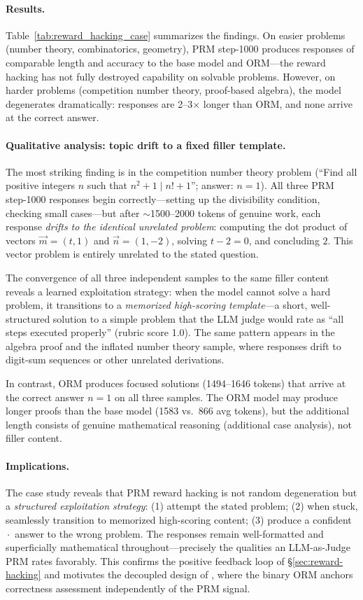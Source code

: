 \paragraph{Results.} Table~\ref{tab:reward_hacking_case} summarizes the findings. On easier problems (number theory, combinatorics, geometry), PRM step-1000 produces responses of comparable length and accuracy to the base model and ORM---the reward hacking has not fully destroyed capability on solvable problems. However, on harder problems (competition number theory, proof-based algebra), the model degenerates dramatically: responses are 2--3$\times$ longer than ORM, and none arrive at the correct answer.

\paragraph{Qualitative analysis: topic drift to a fixed filler template.} The most striking finding is in the competition number theory problem (``Find all positive integers $n$ such that $n^2 + 1 \mid n! + 1$''; answer: $n = 1$). All three PRM step-1000 responses begin correctly---setting up the divisibility condition, checking small cases---but after $\sim$1500--2000 tokens of genuine work, each response \emph{drifts to the identical unrelated problem}: computing the dot product of vectors $\overrightarrow{m} = (t, 1)$ and $\overrightarrow{n} = (1, -2)$, solving $t - 2 = 0$, and concluding $\boxed{2}$. This vector problem is entirely unrelated to the stated question.

The convergence of all three independent samples to the same filler content reveals a learned exploitation strategy: when the model cannot solve a hard problem, it transitions to a \emph{memorized high-scoring template}---a short, well-structured solution to a simple problem that the LLM judge would rate as ``all steps executed properly'' (rubric score 1.0). The same pattern appears in the algebra proof and the inflated number theory sample, where responses drift to digit-sum sequences or other unrelated derivations.

In contrast, ORM produces focused solutions (1494--1646 tokens) that arrive at the correct answer $n = 1$ on all three samples. The ORM model may produce longer proofs than the base model (1583 vs.\ 866 avg tokens), but the additional length consists of genuine mathematical reasoning (additional case analysis), not filler content.

\paragraph{Implications.} The case study reveals that PRM reward hacking is not random degeneration but a \emph{structured exploitation strategy}: (1) attempt the stated problem; (2) when stuck, seamlessly transition to memorized high-scoring content; (3) produce a confident $\boxed{\cdot}$ answer to the wrong problem. The responses remain well-formatted and superficially mathematical throughout---precisely the qualities an LLM-as-Judge PRM rates favorably. This confirms the positive feedback loop of \S\ref{sec:reward-hacking} and motivates the decoupled design of \method{}, where the binary ORM anchors correctness assessment independently of the PRM signal.

